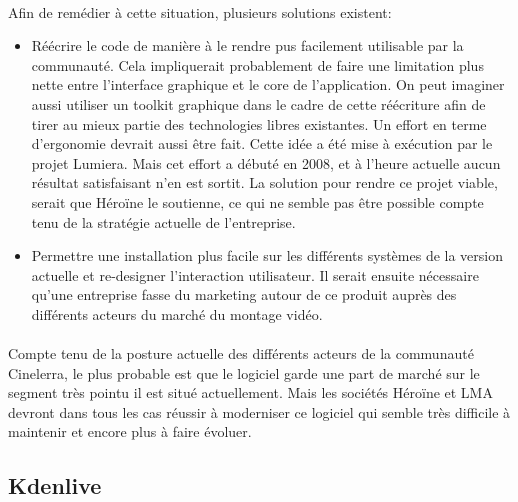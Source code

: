 \paragraph{}

Afin de remédier à cette situation, plusieurs solutions existent:

\begin{itemize}

  \item {Réécrire le code de manière à le rendre pus facilement
    utilisable par la communauté. Cela impliquerait probablement de faire
    une limitation plus nette entre l'interface graphique et le core de
    l'application. On peut imaginer aussi utiliser un toolkit graphique
    dans le cadre de cette réécriture afin de tirer au mieux partie
    des technologies libres existantes. Un effort en terme d'ergonomie
    devrait aussi être fait. Cette idée a été mise à exécution par
    le projet Lumiera. Mais cet effort a débuté en 2008, et à l'heure
    actuelle aucun résultat satisfaisant n'en est sortit. La solution
    pour rendre ce projet viable, serait que Héroïne le soutienne,
    ce qui ne semble pas être possible compte tenu de la stratégie
    actuelle de l'entreprise.}


  \item {Permettre une installation plus facile sur les différents
  systèmes de la version actuelle et re-designer l'interaction
  utilisateur. Il serait
    ensuite nécessaire qu'une entreprise fasse du marketing autour de ce
    produit auprès des différents acteurs du marché du montage vidéo.}

\end{itemize}

\paragraph {}

Compte tenu de la posture actuelle des différents acteurs de la
communauté Cinelerra, le plus probable est que le logiciel garde une part
de marché sur le segment très pointu il est situé actuellement. Mais
les sociétés Héroïne et LMA devront dans tous les cas réussir à
moderniser ce logiciel qui semble très difficile à maintenir et encore
plus à faire évoluer.

\subsection {Kdenlive}

